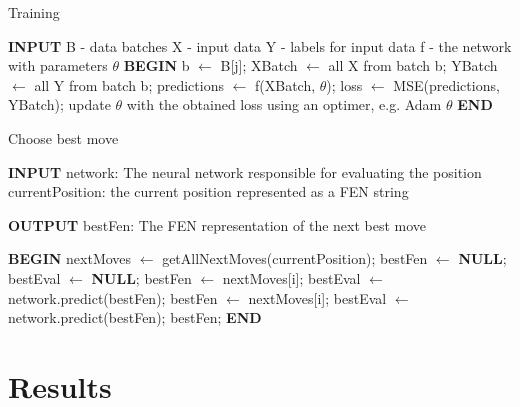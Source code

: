 \documentclass[runningheads,a4paper,11pt]{report}
\begin{document}
\clearpage
\begin{algorithm}
	\caption{Training}
	\label{BestMove}
		\begin{algorithmic}
        
        \STATE \textbf{INPUT}
        \STATE B - data batches
        \STATE X - input data
        \STATE Y - labels for input data
        \STATE f - the network with parameters $\theta$
        \STATE \textbf{BEGIN}
                \STATE b $\leftarrow$ B[j];
                \STATE XBatch $\leftarrow$ all X from batch b;
                \STATE YBatch $\leftarrow$ all Y from batch b;
                \STATE predictions $\leftarrow$ f(XBatch, $\theta$);
                \STATE loss $\leftarrow$ MSE(predictions, YBatch);
                \STATE update $\theta$ with the obtained loss using an optimer, e.g. Adam
            \ENDFOR
        \ENDFOR
        \RETURN $\theta$
  		\STATE \textbf{END}
\end{algorithmic}
\end{algorithm}


\begin{algorithm}
	\caption{Choose best move}
	\label{BestMove}
		\begin{algorithmic}
        
        \STATE \textbf{INPUT}
        \STATE  network: The neural network responsible for evaluating the                       position
        \STATE currentPosition: the current position represented as a FEN string
        
        \STATE \textbf{OUTPUT}
        \STATE  bestFen: The FEN representation of the next best move 
        
		\STATE \textbf{BEGIN}
  		\STATE nextMoves $\leftarrow$ getAllNextMoves(currentPosition);
  		\STATE bestFen $\leftarrow$ \textbf{NULL};
  		\STATE bestEval $\leftarrow$ \textbf{NULL};
  		        \STATE bestFen $\leftarrow$ nextMoves[i];
  		        \STATE bestEval $\leftarrow$ network.predict(bestFen);
  		        \STATE bestFen $\leftarrow$ nextMoves[i];
  		        \STATE bestEval $\leftarrow$ network.predict(bestFen);
  		    \ENDIF
  		\ENDFOR
  		\RETURN bestFen;
  		\STATE \textbf{END}
\end{algorithmic}
\end{algorithm}

\chapter{Results}
\end{document}
